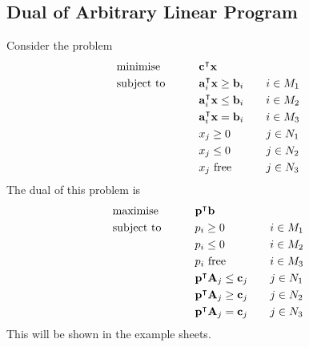 \subsection{Dual of Arbitrary Linear Program}
Consider the problem
\begin{alignat*}{3}
	 & \text{minimise}   & \qquad & \vb c^\intercal \vb x                &       &           \\
	 & \text{subject to} &        & \vb a_i^\intercal \vb x \geq \vb b_i & \quad & i \in M_1 \\
	 &                   &        & \vb a_i^\intercal \vb x \leq \vb b_i &       & i \in M_2 \\
	 &                   &        & \vb a_i^\intercal \vb x = \vb b_i    &       & i \in M_3 \\
	 &                   &        & x_j \geq 0                            &       & j \in N_1 \\
	 &                   &        & x_j \leq 0                            &       & j \in N_2 \\
	 &                   &        & x_j \text{ free}                      &       & j \in N_3 \\
\end{alignat*}
The dual of this problem is
\begin{alignat*}{3}
	 & \text{maximise}   & \qquad & \vb p^\intercal \vb b                &       &           \\
	 & \text{subject to} &        & p_i \geq 0                            & \quad & i \in M_1 \\
	 &                   &        & p_i \leq 0                            &       & i \in M_2 \\
	 &                   &        & p_i \text{ free}                      &       & i \in M_3 \\
	 &                   &        & \vb p^\intercal \vb A_j \leq \vb c_j &       & j \in N_1 \\
	 &                   &        & \vb p^\intercal \vb A_j \geq \vb c_j &       & j \in N_2 \\
	 &                   &        & \vb p^\intercal \vb A_j = \vb c_j    &       & j \in N_3 \\
\end{alignat*}
This will be shown in the example sheets.


